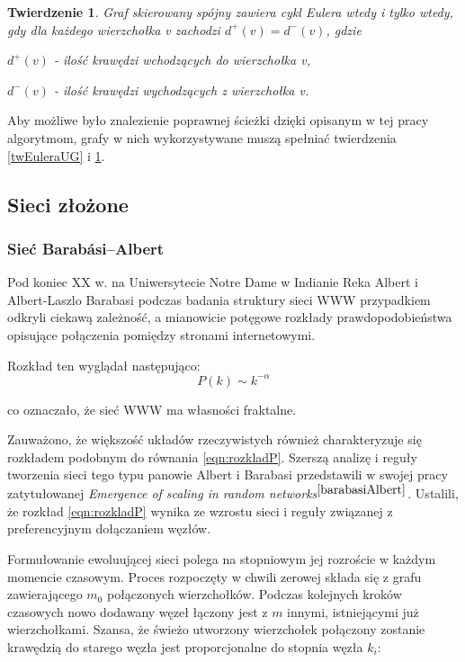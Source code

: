 \documentclass[a4paper, 12pt, twoside, openright]{article}
\newtheorem{theorem}{Twierdzenie}
\begin{document}
	 \begin{theorem}
	 	\label{twEuleraDG}
	 	Graf skierowany spójny zawiera cykl Eulera wtedy i tylko wtedy, gdy
	 	dla każdego wierzchołka v zachodzi $d ^{+} (v) = d ^{-} (v) $, gdzie \indent\par$d ^{+} (v)$ - ilość krawędzi wchodzących do wierzchołka v, \indent\par$d ^{-} (v)$ - ilość krawędzi wychodzących z wierzchołka v.
	 \end{theorem}
 
	 Aby możliwe było znalezienie poprawnej ścieżki dzięki opisanym w tej pracy algorytmom, grafy w nich wykorzystywane muszą spełniać twierdzenia \ref{twEuleraUG} i \ref{twEuleraDG}. 
	 

\subsection{Sieci złożone} \label{SieciZlozone}
\subsubsection{Sieć Barabási–Albert}\label{BarabasiAlbert}
\indent\par

 	Pod koniec XX w. na Uniwersytecie Notre Dame w Indianie Reka Albert i Albert-Laszlo Barabasi podczas badania struktury sieci WWW przypadkiem odkryli ciekawą zależność, a mianowicie potęgowe rozkłady prawdopodobieństwa opisujące połączenia pomiędzy stronami internetowymi.
 
	 Rozkład ten wyglądał następująco:
 	\begin{equation}
 		\label{eqn:rozkladP}
 		P(k) \sim k ^{-\alpha}
 	\end{equation}
 
 	co oznaczało, że sieć WWW ma własności fraktalne.

 	Zauważono, że większość układów rzeczywistych również charakteryzuje się rozkładem podobnym do równania \ref{eqn:rozkladP}. Szerszą analizę i reguły tworzenia sieci tego typu panowie Albert i Barabasi przedstawili w swojej pracy zatytułowanej \textit{Emergence of scaling in random networks}$^{\cite{barabasiAlbert}}$. Ustalili, że rozkład \ref{eqn:rozkladP} wynika ze wzrostu sieci i reguły związanej z preferencyjnym dołączaniem węzłów.
 	
 
	Formułowanie ewoluującej sieci polega na stopniowym jej rozroście w każdym momencie czasowym. Proces rozpoczęty w chwili zerowej składa się z grafu zawierającego $m_0$ połączonych wierzchołków. Podczas kolejnych kroków czasowych nowo dodawany węzeł łączony jest z $m$ innymi, istniejącymi już wierzchołkami.	Szansa, że świeżo utworzony wierzchołek połączony zostanie krawędzią do starego węzła jest proporcjonalne do stopnia węzła $k_i$:
	
\end{document}
